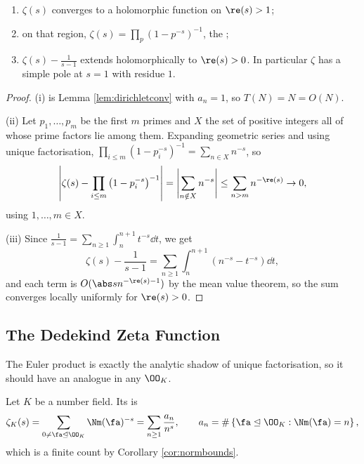 \begin{proposition}\label{prop:zetaprops}
	\begin{enumerate}[label=(\roman*)]
		\item $\zeta(s)$ converges to a holomorphic function on $\re(s)>1$;
		\item on that region, $\displaystyle\zeta(s) = \prod_{p}\left(1-p^{-s}\right)^{-1}$, the ;
		\item $\zeta(s) - \frac1{s-1}$ extends holomorphically to $\re(s)>0$. In particular $\zeta$ has a simple pole at $s=1$ with residue $1$.
	\end{enumerate}
\end{proposition}

\begin{proof}
	(i) is Lemma \ref{lem:dirichletconv} with $a_n = 1$, so $T(N) = N = O(N)$.

	(ii) Let $p_1,\dots,p_m$ be the first $m$ primes and $X$ the set of positive integers all of whose prime factors lie among them. Expanding geometric series and using unique factorisation, $\prod_{i\le m}(1-p_i^{-s})^{-1} = \sum_{n\in X}n^{-s}$, so
	$$\left|\zeta(s) - \prod_{i\le m}\left(1-p_i^{-s}\right)^{-1}\right| = \left|\sum_{n\notin X}n^{-s}\right|\le\sum_{n > m}n^{-\re(s)} \to 0,$$
	using $1,\dots,m \in X$.

	(iii) Since $\frac1{s-1} = \sum_{n\ge1}\int_n^{n+1}t^{-s}\dd t$, we get
	$$\zeta(s)-\frac1{s-1} = \sum_{n\ge1}\int_n^{n+1}\left(n^{-s}-t^{-s}\right)\dd t,$$
	and each term is $O(\abs s n^{-\re(s)-1})$ by the mean value theorem, so the sum converges locally uniformly for $\re(s)>0$.
\end{proof}

\subsection{The Dedekind Zeta Function}

The Euler product is exactly the analytic shadow of unique factorisation, so it should have an analogue in any $\OO_K$.

\begin{definition}
	Let $K$ be a number field. Its  is
	$$\zeta_K(s) = \sum_{0 \neq \fa\trianglelefteq\OO_K}\Nm(\fa)^{-s} = \sum_{n\ge1}\frac{a_n}{n^s}, \qquad a_n = \#\left\{\fa\trianglelefteq\OO_K : \Nm(\fa) = n\right\},$$
	which is a finite count by Corollary \ref{cor:normbounds}.
\end{definition}

